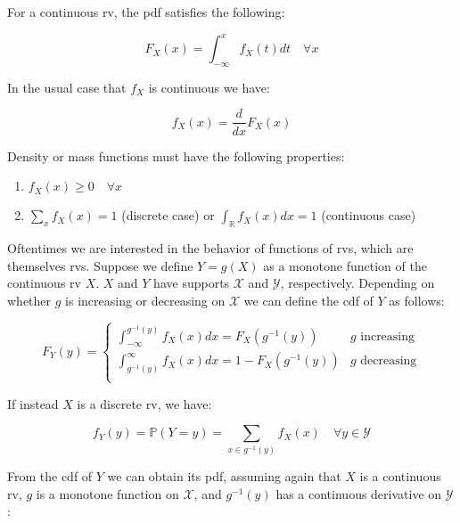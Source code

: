 \documentclass{report}
\begin{document}
For a continuous \gls{rv}, the \gls{pdf} satisfies the following:

\begin{equation}\label{eq:pdf-1}
    F_X(x) = \int_{-\infty}^x f_X(t) dt \quad \forall x
\end{equation}

In the usual case that $f_X$ is continuous we have:

\begin{equation}\label{eq:pdf-2}
    f_X(x) = \frac{d}{dx} F_X(x) 
\end{equation}

Density or mass functions must have the following properties:

\begin{enumerate}
    \item $f_X(x) \geq 0 \quad \forall x$
    \item $\sum_x f_X(x) = 1$ (discrete case) or $\int_{\mathbb{R}} f_X(x) dx = 1$ (continuous case) 
\end{enumerate}

Oftentimes we are interested in the behavior of functions of \glspl{rv}, which are themselves \glspl{rv}. Suppose we define $Y = g(X)$ as a monotone function of the continuous \gls{rv} $X$. $X$ and $Y$ have supports $\mathcal{X}$ and $\mathcal{Y}$, respectively. Depending on whether $g$ is increasing or decreasing on $\mathcal{X}$ we can define the \gls{cdf} of $Y$ as follows:

\begin{equation}\label{eq:cdf-of-transformation}
    F_Y(y) = \begin{cases}
        \int_{-\infty}^{g^{-1}(y)} f_X(x) dx = F_X\left(g^{-1}(y)\right) & g \text{ increasing} \\
        \int_{g^{-1}(y)}^\infty f_X(x) dx = 1 - F_X\left(g^{-1}(y)\right) & g \text{ decreasing} \\
    \end{cases}
\end{equation}

If instead $X$ is a discrete \gls{rv}, we have:

\begin{equation}\label{eq:pmf-of-transformation}
    f_Y(y) = \mathbb{P}(Y = y) = \sum_{x \in g^{-1}(y)} f_X(x) \quad \forall y \in \mathcal{Y}
\end{equation}

From the \gls{cdf} of $Y$ we can obtain its \gls{pdf}, assuming again that $X$ is a continuous \gls{rv}, $g$ is a monotone function on $\mathcal{X}$, and $g^{-1}(y)$ has a continuous derivative on $\mathcal{Y}$:
\end{document}
